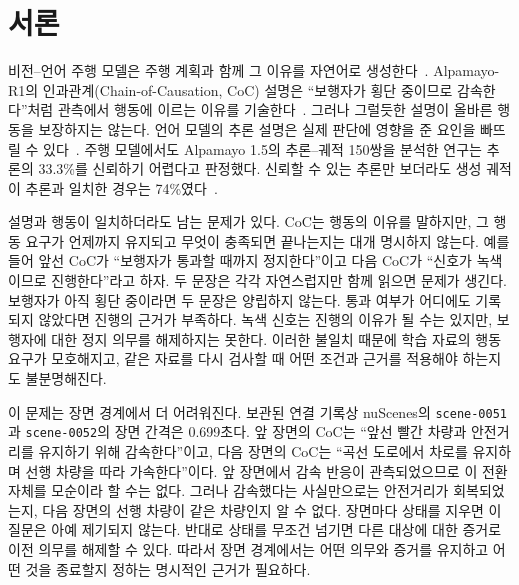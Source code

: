 \section{서론}
\label{sec:intro}

\begin{revision}
비전--언어 주행 모델은 주행 계획과 함께 그 이유를 자연어로 생성한다~\cite{sima2024drivelm,tian2024drivevlm,wang2025alpamayo}. Alpamayo-R1의 인과관계(Chain-of-Causation, CoC) 설명은 ``보행자가 횡단 중이므로 감속한다''처럼 관측에서 행동에 이르는 이유를 기술한다~\cite{wang2025alpamayo,nvidia2026autolabeler}. 그러나 그럴듯한 설명이 올바른 행동을 보장하지는 않는다. 언어 모델의 추론 설명은 실제 판단에 영향을 준 요인을 빠뜨릴 수 있다~\cite{turpin2023,lanham2023}. 주행 모델에서도 Alpamayo 1.5의 추론--궤적 150쌍을 분석한 연구는 추론의 33.3\%를 신뢰하기 어렵다고 판정했다. 신뢰할 수 있는 추론만 보더라도 생성 궤적이 추론과 일치한 경우는 74\%였다~\cite{yu2026drivethoughts}.

\begin{figure}[t]
\centering
\color{revisionblue}

\label{fig:overview-pipeline}
\end{figure}

설명과 행동이 일치하더라도 남는 문제가 있다. CoC는 행동의 이유를 말하지만, 그 행동 요구가 언제까지 유지되고 무엇이 충족되면 끝나는지는 대개 명시하지 않는다. 예를 들어 앞선 CoC가 ``보행자가 통과할 때까지 정지한다''이고 다음 CoC가 ``신호가 녹색이므로 진행한다''라고 하자. 두 문장은 각각 자연스럽지만 함께 읽으면 문제가 생긴다. 보행자가 아직 횡단 중이라면 두 문장은 양립하지 않는다. 통과 여부가 어디에도 기록되지 않았다면 진행의 근거가 부족하다. 녹색 신호는 진행의 이유가 될 수는 있지만, 보행자에 대한 정지 의무를 해제하지는 못한다. 이러한 불일치 때문에 학습 자료의 행동 요구가 모호해지고, 같은 자료를 다시 검사할 때 어떤 조건과 근거를 적용해야 하는지도 불분명해진다.

이 문제는 장면 경계에서 더 어려워진다. 보관된 연결 기록상 nuScenes의 \texttt{scene-0051}과 \texttt{scene-0052}의 장면 간격은 0.699초다. 앞 장면의 CoC는 ``앞선 빨간 차량과 안전거리를 유지하기 위해 감속한다''이고, 다음 장면의 CoC는 ``곡선 도로에서 차로를 유지하며 선행 차량을 따라 가속한다''이다. 앞 장면에서 감속 반응이 관측되었으므로 이 전환 자체를 모순이라 할 수는 없다. 그러나 감속했다는 사실만으로는 안전거리가 회복되었는지, 다음 장면의 선행 차량이 같은 차량인지 알 수 없다. 장면마다 상태를 지우면 이 질문은 아예 제기되지 않는다. 반대로 상태를 무조건 넘기면 다른 대상에 대한 증거로 이전 의무를 해제할 수 있다. 따라서 장면 경계에서는 어떤 의무와 증거를 유지하고 어떤 것을 종료할지 정하는 명시적인 근거가 필요하다.


\end{revision}
